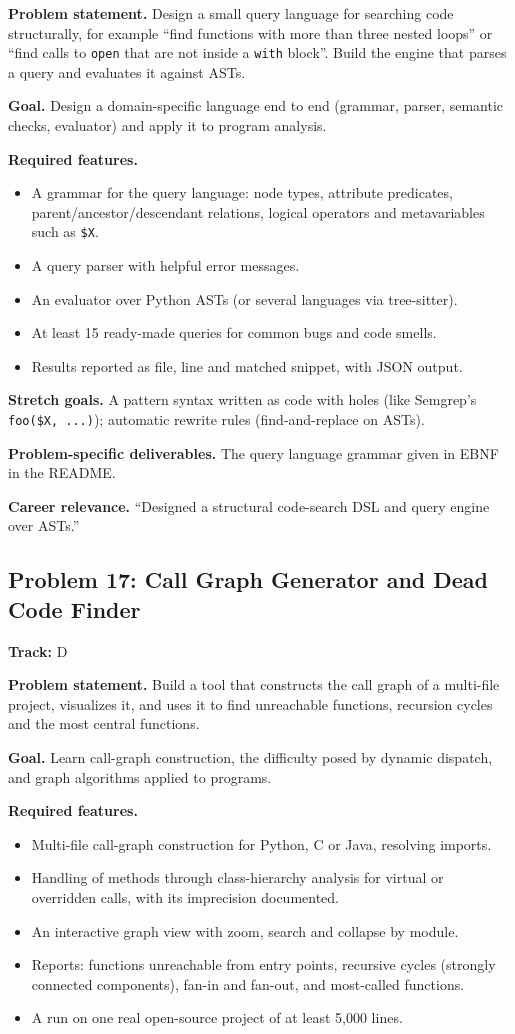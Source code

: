 \documentclass[11pt,a4paper]{article}
\newcommand{\fld}[1]{\par\smallskip\textbf{\color{accent}#1}\quad}
\newcommand{\meta}[1]{%
  \begin{tcolorbox}[colback=softbg,colframe=softbg,boxsep=2pt,left=4pt,right=4pt,top=2pt,bottom=2pt,arc=2pt]
  \small\textbf{Track:} #1
  \end{tcolorbox}}
\begin{document}
\fld{Problem statement.} Design a small query language for searching code structurally, for example
``find functions with more than three nested loops'' or ``find calls to \texttt{open} that are not
inside a \texttt{with} block''. Build the engine that parses a query and evaluates it against ASTs.

\fld{Goal.} Design a domain-specific language end to end (grammar, parser, semantic checks,
evaluator) and apply it to program analysis.

\fld{Required features.}
\begin{itemize}
  \item A grammar for the query language: node types, attribute predicates, parent/ancestor/descendant relations, logical operators and metavariables such as \texttt{\$X}.
  \item A query parser with helpful error messages.
  \item An evaluator over Python ASTs (or several languages via tree-sitter).
  \item At least 15 ready-made queries for common bugs and code smells.
  \item Results reported as file, line and matched snippet, with JSON output.
\end{itemize}

\fld{Stretch goals.} A pattern syntax written as code with holes (like Semgrep's \texttt{foo(\$X, ...)});
automatic rewrite rules (find-and-replace on ASTs).

\fld{Problem-specific deliverables.} The query language grammar given in EBNF in the README.

\fld{Career relevance.} ``Designed a structural code-search DSL and query engine over ASTs.''

\subsection{Problem 17: Call Graph Generator and Dead Code Finder}
\meta{D}

\fld{Problem statement.} Build a tool that constructs the call graph of a multi-file project,
visualizes it, and uses it to find unreachable functions, recursion cycles and the most central functions.

\fld{Goal.} Learn call-graph construction, the difficulty posed by dynamic dispatch, and graph algorithms applied to programs.

\fld{Required features.}
\begin{itemize}
  \item Multi-file call-graph construction for Python, C or Java, resolving imports.
  \item Handling of methods through class-hierarchy analysis for virtual or overridden calls, with its imprecision documented.
  \item An interactive graph view with zoom, search and collapse by module.
  \item Reports: functions unreachable from entry points, recursive cycles (strongly connected components), fan-in and fan-out, and most-called functions.
  \item A run on one real open-source project of at least 5{,}000 lines.
\end{itemize}
\end{document}
